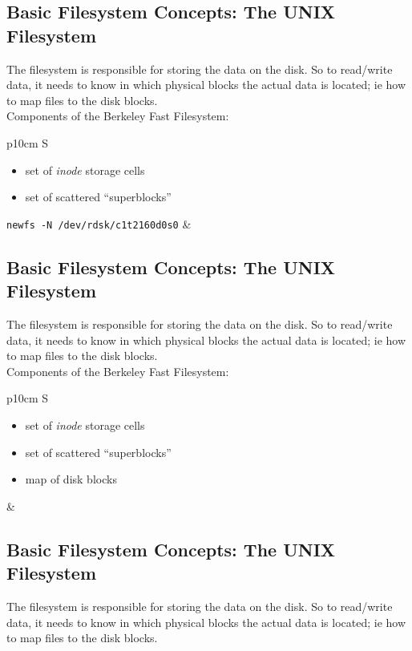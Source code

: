\documentclass[xga]{xdvislides}
\begin{document}
\subsection{Basic Filesystem Concepts: The UNIX Filesystem}
The filesystem is responsible for storing the data on the disk.
So to read/write data, it needs to know in which physical blocks the actual
data is located; ie how to map files to the disk blocks.
\\

Components of the Berkeley Fast Filesystem:
\\

\begin{tabular}{ p{10cm} S }
\begin{itemize}
	\item set of {\em inode} storage cells
	\item set of scattered ``superblocks''
\end{itemize}
{\tt newfs -N /dev/rdsk/c1t2160d0s0}
&  \\
\end{tabular}

\subsection{Basic Filesystem Concepts: The UNIX Filesystem}
The filesystem is responsible for storing the data on the disk.
So to read/write data, it needs to know in which physical blocks the actual
data is located; ie how to map files to the disk blocks.
\\

Components of the Berkeley Fast Filesystem:
\\

\begin{tabular}{ p{10cm} S }
\begin{itemize}
	\item set of {\em inode} storage cells
	\item set of scattered ``superblocks''
	\item map of disk blocks
\end{itemize}
&  \\
\end{tabular}

\subsection{Basic Filesystem Concepts: The UNIX Filesystem}
The filesystem is responsible for storing the data on the disk.
So to read/write data, it needs to know in which physical blocks the actual
data is located; ie how to map files to the disk blocks.
\\
\end{document}
